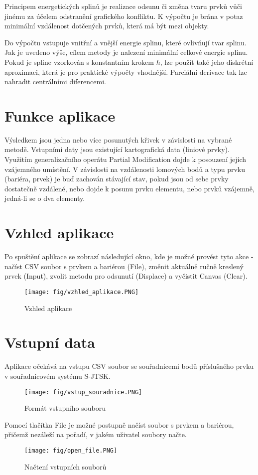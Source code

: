 \documentclass[oneside,12pt,a4paper]{book}
\begin{document}
Principem energetických splinů je realizace odsunu či změna tvaru prvků vůči jinému za účelem odstranění grafického konfliktu. K výpočtu je brána v potaz minimální vzdálenost dotčených prvků, která má být mezi objekty.\par
Do výpočtu vstupuje vnitřní a vnější energie splinu, které ovlivňují tvar splinu. Jak je uvedeno výše, cílem metody je nalezení minimální celkové energie splinu. Pokud je spline vzorkován s konstantním krokem $h$, lze použít také jeho diskrétní aproximaci, která je pro praktické výpočty vhodnější. Parciální derivace tak lze nahradit centrálními diferencemi.\par

\chapter{Funkce aplikace}
Výsledkem jsou jedna nebo více posunutých křivek v závislosti na vybrané metodě. Vstupními daty jsou existující kartografická data (liniové prvky). Využitím generalizačního operátu Partial Modification dojde k posouzení jejích vzájemného umístění. V závislosti na vzdálenosti lomových bodů a typu prvku (bariéra, prvek) je buď zachován stávající stav, pokud jsou od sebe prvky dostatečně vzdálené, nebo dojde k posunu prvku elementu, nebo prvků vzájemně, jedná-li se o dva elementy.\par

\pagebreak
\chapter{Vzhled aplikace}

Po spuštění aplikace se zobrazí následující okno, kde je možné provést tyto akce - načíst CSV soubor s prvkem a bariérou (File), změnit aktuálně ručně kreslený prvek (Input), zvolit metodu pro odsunutí (Displace) a vyčistit Canvas (Clear). \par

\begin{figure}[ht!]
    \centering
    \texttt{[image: fig/vzhled\_aplikace.PNG]}
    \caption{Vzhled aplikace}
    \label{fig:Zadání úlohy}
\end{figure}

\pagebreak
\chapter{Vstupní data} 
Aplikace očekává na vstupu CSV soubor se souřadnicemi bodů příslušného prvku v souřadnicovém systému S-JTSK. \par
\begin{figure}[ht!]
    \centering
    \texttt{[image: fig/vstup\_souradnice.PNG]}
    \caption{Formát vstupního souboru}
    \label{fig:Zadání úlohy}
\end{figure}
Pomocí tlačítka File je možné postupně načíst soubor s prvkem a bariérou, přičemž nezáleží na pořadí, v jakém uživatel soubory načte.
\begin{figure}[ht!]
    \centering
    \texttt{[image: fig/open\_file.PNG]}
    \caption{Načtení vstupních souborů}
    \label{fig:Zadání úlohy}
\end{figure}
\end{document}
